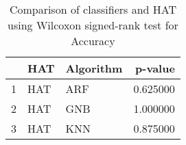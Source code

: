 \begin{table}
\footnotesize
\caption{Comparison of classifiers and HAT using Wilcoxon signed-rank test for Accuracy}
\label{tab:HAT wilcoxon Accuracy comparison}
\begin{tabular}{lllr}
\hline
 & HAT & Algorithm & p-value \\
\hline
1 & HAT & ARF & 0.625000 \\
2 & HAT & GNB & 1.000000 \\
3 & HAT & KNN & 0.875000 \\
\hline
\end{tabular}
\end{table}
